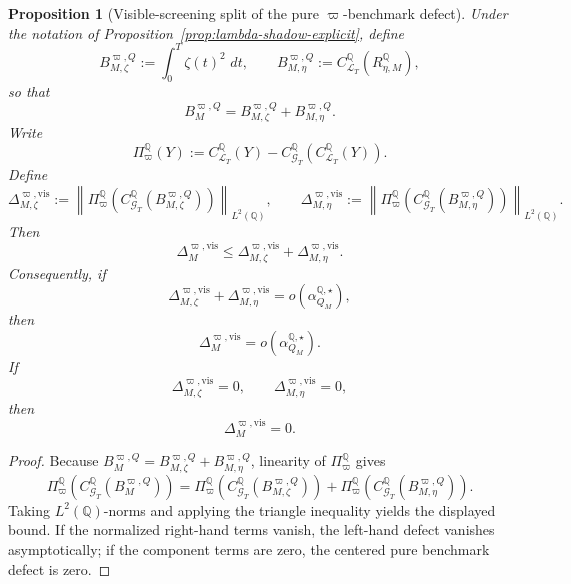 \documentclass[11pt,a4paper]{amsart}
\theoremstyle{plain}
\newtheorem{proposition}[theorem]{Proposition}
\theoremstyle{definition}
\theoremstyle{remark}
\newcommand{\QQ}{\mathbb{Q}}
\newcommand{\cG}{\mathcal{G}}
\newcommand{\cL}{\mathcal{L}}
\newcommand{\dd}{\,d}
\begin{document}
\begin{proposition}[Visible-screening split of the pure \(\varpi\)-benchmark defect]\label{prop:lambda-shadow-visible}
Under the notation of Proposition~\ref{prop:lambda-shadow-explicit}, define
\[
        B_{M,\zeta}^{\varpi,Q}
        :=
        \int_0^T \zeta(t)^2\,\dd t,
        \qquad
        B_{M,\eta}^{\varpi,Q}
        :=
        C_{\cL_T}^\QQ(R_{\eta,M}^\QQ),
\]
so that
\[
        B_{M}^{\varpi,Q}
        =
        B_{M,\zeta}^{\varpi,Q}
        +
        B_{M,\eta}^{\varpi,Q}.
\]
Write
\[
        \Pi_\varpi^\QQ(Y)
        :=
        C_{\cL_T}^\QQ(Y)
        -
        C_{\cG_T}^\QQ\!\left(C_{\cL_T}^\QQ(Y)\right).
\]
Define
\[
        \Delta_{M,\zeta}^{\varpi,\mathrm{vis}}
        :=
        \left\|
                \Pi_\varpi^\QQ\!\left(
                        C_{\cG_T}^\QQ(B_{M,\zeta}^{\varpi,Q})
                \right)
        \right\|_{L^2(\QQ)},
        \qquad
        \Delta_{M,\eta}^{\varpi,\mathrm{vis}}
        :=
        \left\|
                \Pi_\varpi^\QQ\!\left(
                        C_{\cG_T}^\QQ(B_{M,\eta}^{\varpi,Q})
                \right)
        \right\|_{L^2(\QQ)}.
\]
Then
\[
        \Delta_{M}^{\varpi,\mathrm{vis}}
        \le
        \Delta_{M,\zeta}^{\varpi,\mathrm{vis}}
        +
        \Delta_{M,\eta}^{\varpi,\mathrm{vis}}.
\]
Consequently, if
\[
        \Delta_{M,\zeta}^{\varpi,\mathrm{vis}}
        +
        \Delta_{M,\eta}^{\varpi,\mathrm{vis}}
        =
        o\!\left(\alpha_{Q_M}^{\QQ,\star}\right),
\]
then
\[
        \Delta_{M}^{\varpi,\mathrm{vis}}
        =
        o\!\left(\alpha_{Q_M}^{\QQ,\star}\right).
\]
If
\[
        \Delta_{M,\zeta}^{\varpi,\mathrm{vis}}=0,
        \qquad
        \Delta_{M,\eta}^{\varpi,\mathrm{vis}}=0,
\]
then
\[
        \Delta_{M}^{\varpi,\mathrm{vis}}=0.
\]
\end{proposition}

\begin{proof}
Because \(B_{M}^{\varpi,Q}=B_{M,\zeta}^{\varpi,Q}+B_{M,\eta}^{\varpi,Q}\), linearity of
\(\Pi_\varpi^\QQ\) gives
\[
        \Pi_\varpi^\QQ\!\left(
                C_{\cG_T}^\QQ(B_{M}^{\varpi,Q})
        \right)
        =
        \Pi_\varpi^\QQ\!\left(
                C_{\cG_T}^\QQ(B_{M,\zeta}^{\varpi,Q})
        \right)
        +
        \Pi_\varpi^\QQ\!\left(
                C_{\cG_T}^\QQ(B_{M,\eta}^{\varpi,Q})
        \right).
\]
Taking \(L^2(\QQ)\)-norms and applying the triangle inequality yields the displayed bound.  If the
normalized right-hand terms vanish, the left-hand defect vanishes asymptotically; if the component
terms are zero, the centered pure benchmark defect is zero.
\end{proof}
\end{document}
